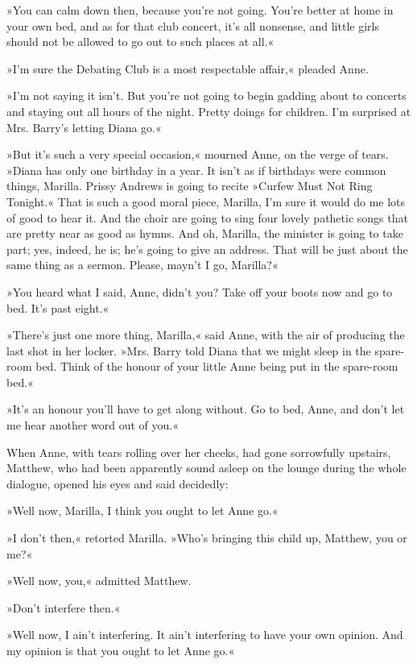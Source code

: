 »You can calm down then, because you’re not going. You’re better at home in your own bed, and as for that club concert, it’s all nonsense, and little girls should not be allowed to go out to such places at all.«

»I’m sure the Debating Club is a most respectable affair,« pleaded Anne.

»I’m not saying it isn’t. But you’re not going to begin gadding about to concerts and staying out all hours of the night. Pretty doings for children. I’m surprised at Mrs. Barry’s letting Diana go.«

»But it’s such a very special occasion,« mourned Anne, on the verge of tears. »Diana has only one birthday in a year. It isn’t as if birthdays were common things, Marilla. Prissy Andrews is going to recite »Curfew Must Not Ring Tonight.« That is such a good moral piece, Marilla, I’m sure it would do me lots of good to hear it. And the choir are going to sing four lovely pathetic songs that are pretty near as good as hymns. And oh, Marilla, the minister is going to take part; yes, indeed, he is; he’s going to give an address. That will be just about the same thing as a sermon. Please, mayn’t I go, Marilla?«

»You heard what I said, Anne, didn’t you? Take off your boots now and go to bed. It’s past eight.«

»There’s just one more thing, Marilla,« said Anne, with the air of producing the last shot in her locker. »Mrs. Barry told Diana that we might sleep in the spare-room bed. Think of the honour of your little Anne being put in the spare-room bed.«

»It’s an honour you’ll have to get along without. Go to bed, Anne, and don’t let me hear another word out of you.«

When Anne, with tears rolling over her cheeks, had gone sorrowfully upstairs, Matthew, who had been apparently sound asleep on the lounge during the whole dialogue, opened his eyes and said decidedly:

»Well now, Marilla, I think you ought to let Anne go.«

»I don’t then,« retorted Marilla. »Who’s bringing this child up, Matthew, you or me?«

»Well now, you,« admitted Matthew.

»Don’t interfere then.«

»Well now, I ain’t interfering. It ain’t interfering to have your own opinion. And my opinion is that you ought to let Anne go.«

